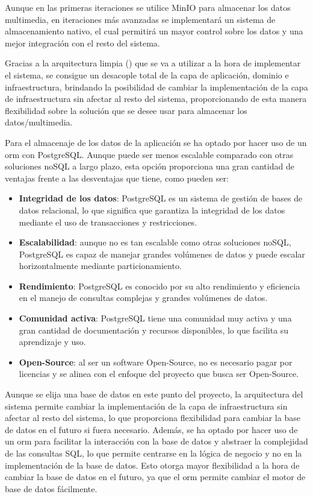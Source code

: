 Aunque en las primeras iteraciones se utilice MinIO para almacenar los datos multimedia, en iteraciones más avanzadas se implementará un sistema de almacenamiento nativo, el cual permitirá un mayor control sobre los datos y una mejor integración con el resto del sistema.

Gracias a la arquitectura limpia (\cite{uncle-bob-clean-architecture}) que se va a utilizar a la hora de implementar el sistema, se consigue un desacople total de la capa de aplicación, dominio e infraestructura, brindando la posibilidad de cambiar la implementación de la capa de infraestructura sin afectar al resto del sistema, proporcionando de esta manera flexibilidad sobre la solución que se desee usar para almacenar los datos/multimedia.

Para el almacenaje de los datos de la aplicación se ha optado por hacer uso de un \acrshort{orm} con PostgreSQL.
Aunque puede ser menos escalable comparado con otras soluciones noSQL a largo plazo, esta opción proporciona una gran cantidad de ventajas frente a las desventajas que tiene, como pueden ser:
\begin{itemize}
    \item \textbf{Integridad de los datos}: PostgreSQL es un sistema de gestión de bases de datos relacional, lo que significa que garantiza la integridad de los datos mediante el uso de transacciones y restricciones.
    \item \textbf{Escalabilidad}: aunque no es tan escalable como otras soluciones noSQL, PostgreSQL es capaz de manejar grandes volúmenes de datos y puede escalar horizontalmente mediante particionamiento.
    \item \textbf{Rendimiento}: PostgreSQL es conocido por su alto rendimiento y eficiencia en el manejo de consultas complejas y grandes volúmenes de datos.
    \item \textbf{Comunidad activa}: PostgreSQL tiene una comunidad muy activa y una gran cantidad de documentación y recursos disponibles, lo que facilita su aprendizaje y uso.
    \item \textbf{Open-Source}: al ser un software Open-Source, no es necesario pagar por licencias y se alinea con el enfoque del proyecto que busca ser Open-Source.
\end{itemize}

Aunque se elija una base de datos en este punto del proyecto, la arquitectura del sistema permite cambiar la implementación de la capa de infraestructura sin afectar al resto del sistema, lo que proporciona flexibilidad para cambiar la base de datos en el futuro si fuera necesario.
Además, se ha optado por hacer uso de un \acrshort{orm} para facilitar la interacción con la base de datos y abstraer la complejidad de las consultas SQL, lo que permite centrarse en la lógica de negocio y no en la implementación de la base de datos.
Esto otorga mayor flexibilidad a la hora de cambiar la base de datos en el futuro, ya que el \acrshort{orm} permite cambiar el motor de base de datos fácilmente.

